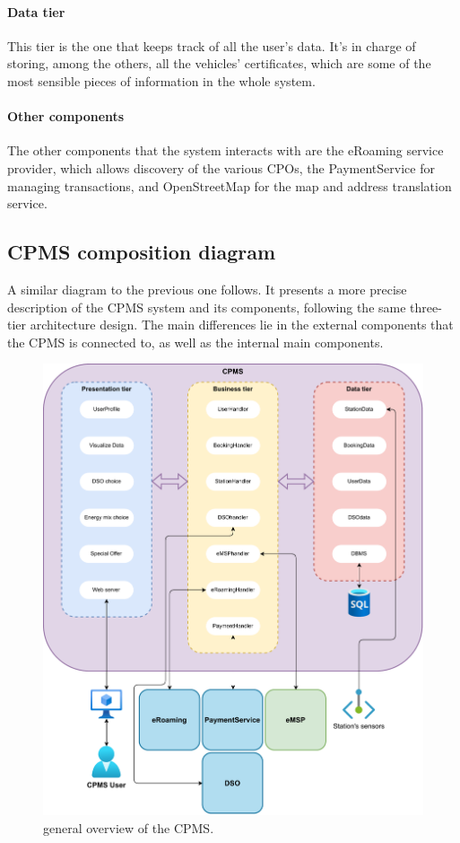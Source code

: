 \paragraph{Data tier} This tier is the one that keeps track of all the user's data. It's in charge of storing, among the others, all the vehicles' certificates, which are some of the most sensible pieces of information in the whole system.

\paragraph{Other components} The other components that the system interacts with are the eRoaming service provider, which allows discovery of the various CPOs, the PaymentService for managing transactions, and OpenStreetMap for the map and address translation service.

\subsection{CPMS composition diagram}

A similar diagram to the previous one follows. It presents a more precise description of the CPMS system and its components, following the same three-tier architecture design. The main differences lie in the external components that the CPMS is connected to, as well as the internal main components.

\begin{figure}[h!]
    \centering
    \includegraphics[width=0.79\columnwidth]{./images/overview/cpms}
    \caption{general overview of the CPMS.}
\end{figure}

